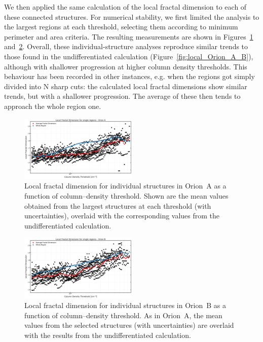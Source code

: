 We then applied the same calculation of the local fractal dimension to each of these connected structures. For numerical stability, we first limited the analysis to the largest regions at each threshold, selecting them according to minimum perimeter and area criteria. The resulting measurements are shown in Figures~\ref{fig:local_A_single_structures} and~\ref{fig:local_B_single_structures}. Overall, these individual-structure analyses reproduce similar trends to those found in the undifferentiated calculation (Figure~\ref{fig:local_Orion_A_B}), although with shallower progression at higher column density thresholds. 
This behaviour has been recorded in other instances, e.g. when the regions got simply divided into N sharp cuts: the calculated local fractal dimensions show similar trends, but with a shallower progression. The average of these then tends to approach the whole region one.   

\begin{figure}[t]
    \centering
    \includegraphics[width=0.5\textwidth]{figures/local_Orion_A_single_structures.png}
    \caption{Local fractal dimension for individual structures in Orion~A as a function of column--density threshold. 
    Shown are the mean values obtained from the largest structures at each threshold (with uncertainties), overlaid with the corresponding values from the undifferentiated calculation.}
    \label{fig:local_A_single_structures}
\end{figure}

\begin{figure}[t]
    \centering
    \includegraphics[width=0.5\textwidth]{figures/local_Orion_B_single_structures.png}
    \caption{Local fractal dimension for individual structures in Orion~B as a function of column--density threshold. 
    As in Orion~A, the mean values from the selected structures (with uncertainties) are overlaid with the results from the undifferentiated calculation.}
    \label{fig:local_B_single_structures}
\end{figure}

